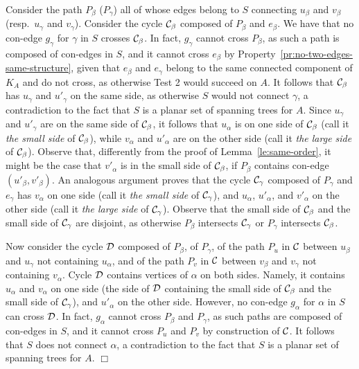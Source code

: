 \documentclass[letter,runningheads]{llncs}
\renewenvironment{proof}
{{\em Proof.\ }}{\hspace*{\fill}$\Box$\par\vspace{2mm}}
\begin{document}
\begin{proof}
Consider the path $P_{\beta}$ ($P_{\gamma}$) all of whose edges belong to $S$ connecting $u_{\beta}$ and $v_{\beta}$ (resp.\ $u_{\gamma}$ and $v_{\gamma}$).
Consider the cycle ${\cal C}_{\beta}$ composed of $P_{\beta}$ and $e_{\beta}$. We have that no con-edge $g_{\gamma}$ for $\gamma$ in $S$ crosses ${\cal C}_{\beta}$. In fact, $g_{\gamma}$ cannot cross $P_{\beta}$, as such a path is composed of con-edges in $S$, and it cannot cross $e_{\beta}$ by Property~\ref{pr:no-two-edges-same-structure}, given that $e_{\beta}$ and $e_{\gamma}$ belong to the same connected component of $K_A$ and do not cross, as otherwise {\sc Test 2} would succeed on $A$. It follows that ${\cal C}_{\beta}$ has $u_{\gamma}$ and $u'_{\gamma}$ on the same side, as otherwise $S$ would not connect $\gamma$, a contradiction to the fact that $S$ is a planar set of spanning trees for $A$.  Since $u_{\gamma}$ and $u'_{\gamma}$ are on the same side of ${\cal C}_{\beta}$, it follows that $u_{\alpha}$ is on one side of ${\cal C}_{\beta}$ (call it {\em the small side} of ${\cal C}_{\beta}$), while $v_{\alpha}$ and $u'_{\alpha}$ are on the other side (call it {\em the large side} of ${\cal C}_{\beta}$). Observe that, differently from the proof of Lemma~\ref{le:same-order}, it might be the case that $v'_{\alpha}$ is in the small side of ${\cal C}_{\beta}$, if $P_{\beta}$ contains con-edge $(u'_{\beta},v'_{\beta})$.
An analogous argument proves that the cycle ${\cal C}_{\gamma}$ composed of $P_{\gamma}$ and $e_{\gamma}$ has $v_{\alpha}$ on one side (call it {\em the small side} of ${\cal C}_{\gamma}$), and $u_{\alpha}$, $u'_{\alpha}$, and $v'_{\alpha}$ on the other side (call it {\em the large side} of ${\cal C}_{\gamma}$).
Observe that the small side of ${\cal C}_{\beta}$ and the small side of ${\cal C}_{\gamma}$ are disjoint, as otherwise $P_{\beta}$ intersects ${\cal C}_{\gamma}$ or $P_{\gamma}$ intersects ${\cal C}_{\beta}$.

Now consider the cycle ${\cal D}$ composed of $P_{\beta}$, of $P_{\gamma}$, of the path $P_u$ in $\cal C$ between $u_{\beta}$ and $u_{\gamma}$ not containing $u_{\alpha}$, and of the path $P_v$ in $\cal C$ between $v_{\beta}$ and $v_{\gamma}$ not containing $v_{\alpha}$. Cycle ${\cal D}$ contains vertices of $\alpha$ on both sides. Namely, it contains $u_{\alpha}$ and $v_{\alpha}$ on one side (the side of ${\cal D}$ containing the small side of ${\cal C}_{\beta}$ and the small side of ${\cal C}_{\gamma}$), and $u'_{\alpha}$ on the other side. However, no con-edge $g_{\alpha}$ for $\alpha$ in $S$ can cross ${\cal D}$. In fact, $g_{\alpha}$ cannot cross $P_{\beta}$ and $P_{\gamma}$, as such paths are composed of con-edges in $S$, and it cannot cross $P_u$ and $P_v$ by construction of $\cal C$. It follows that $S$ does not connect $\alpha$, a contradiction to the fact that $S$ is a planar set of spanning trees for $A$.
\end{proof}
\end{document}
